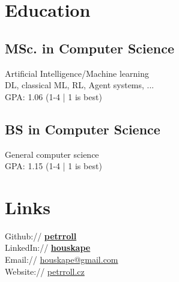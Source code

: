 \documentclass[a4paper]{deedy-resume} %
\begin{document}
\begin{minipage}[t]{0.33\textwidth} %


\section{Education} 

\subsection{MSc. in Computer Science}
Artificial Intelligence/Machine learning \\
DL, classical ML, RL, Agent systems, ... \\
GPA: 1.06 (1-4 | 1 is best) \\

\sectionspace %

\subsection{BS in Computer Science}
General computer science \\
GPA: 1.15 (1-4 | 1 is best) \\

\sectionspace %


\section{Links} 

Github:// \href{https://github.com/petrroll}{\bf petrroll} \\
LinkedIn:// \href{https://www.linkedin.com/in/houskape}{\bf houskape} \\
Email:// \href{mailto:houskape@gmail.com}{houskape@gmail.com} \\
Website:// \href{http://www.petrroll.cz}{petrroll.cz} \\


\end{minipage}
\end{document}
